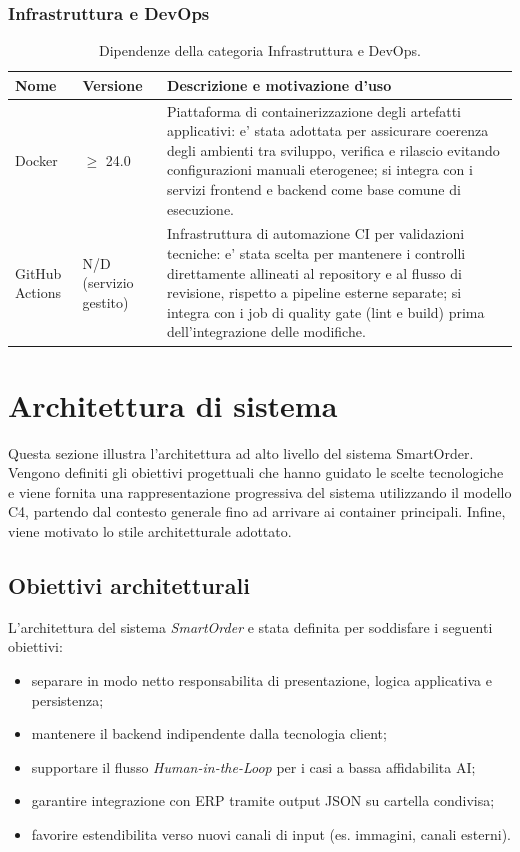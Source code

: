 \documentclass[a4paper, 11pt, oneside]{scrartcl}
\begin{document}
\subsubsection{Infrastruttura e DevOps}
\begin{table}[H]
    \centering
    \renewcommand{\arraystretch}{1.2}
    \begin{tabularx}{\textwidth}{@{}l l X@{}}
        \toprule
        \textbf{Nome} & \textbf{Versione} & \textbf{Descrizione e motivazione d'uso} \\
        \midrule
        Docker & $\geq$ 24.0 & Piattaforma di containerizzazione degli artefatti applicativi: e' stata adottata per assicurare coerenza degli ambienti tra sviluppo, verifica e rilascio evitando configurazioni manuali eterogenee; si integra con i servizi frontend e backend come base comune di esecuzione. \\
        GitHub Actions & N/D (servizio gestito) & Infrastruttura di automazione CI per validazioni tecniche: e' stata scelta per mantenere i controlli direttamente allineati al repository e al flusso di revisione, rispetto a pipeline esterne separate; si integra con i job di quality gate (lint e build) prima dell'integrazione delle modifiche. \\
        \bottomrule
    \end{tabularx}
    \caption{Dipendenze della categoria Infrastruttura e DevOps.}
    \label{tab:dip_infra_devops}
\end{table}

\newpage
\section{Architettura di sistema}
Questa sezione illustra l'architettura ad alto livello del sistema SmartOrder. Vengono definiti gli obiettivi progettuali che hanno guidato le scelte tecnologiche e viene fornita una rappresentazione progressiva del sistema utilizzando il modello C4, partendo dal contesto generale fino ad arrivare ai container principali. Infine, viene motivato lo stile architetturale adottato.

\subsection{Obiettivi architetturali}
L'architettura del sistema \textit{SmartOrder} e stata definita per soddisfare i seguenti obiettivi:
\begin{itemize}
    \item separare in modo netto responsabilita di presentazione, logica applicativa e persistenza;
    \item mantenere il backend indipendente dalla tecnologia client;
    \item supportare il flusso \textit{Human-in-the-Loop} per i casi a bassa affidabilita AI;
    \item garantire integrazione con ERP tramite output JSON su cartella condivisa;
    \item favorire estendibilita verso nuovi canali di input (es. immagini, canali esterni).
\end{itemize}
\end{document}
